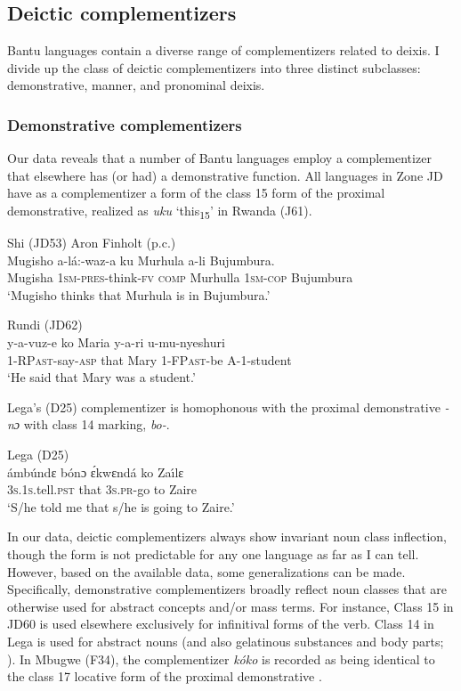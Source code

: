 \documentclass[output=paper,colorlinks,citecolor=brown,
]{langscibook}
\begin{document}
\subsection{Deictic complementizers}\label{sec:gluckman:deicticcompsection}
Bantu languages contain a diverse range of complementizers related to deixis. I divide up the class  of deictic complementizers into three distinct subclasses: demonstrative, manner, and pronominal deixis.

\subsubsection{Demonstrative complementizers}\label{sec:gluckman:demcompsection}

Our data reveals that a number of Bantu languages employ a complementizer that elsewhere has (or had) a demonstrative function. All languages in Zone JD have as a complementizer a form of the class 15 form of the proximal demonstrative, realized as \textit{uku} `this\textsubscript{15}' in Rwanda (J61).

\newpage
\ea
	\begin{xlist}
	\ex Shi (JD53) Aron Finholt (p.c.) \\
	\gll Mugisho a-lá:-waz-a ku Murhula a-li Bujumbura.\\
	Mugisha 1\textsc{sm}-\textsc{pres}-think-\textsc{fv} \textsc{comp} Murhulla 1\textsc{sm}-\textsc{cop} Bujumbura\\
	\glt `Mugisho thinks that Murhula is in Bujumbura.' 
	
	\ex Rundi (JD62) \citep[200]{Sabimana:1986} \\
	\gll y-a-vuz-e ko Maria y-a-ri u-mu-nyeshuri\\
	1-\textsc{RPast}-say-\textsc{asp} that Mary 1-\textsc{FPast}-be \textsc{A}-1-student\\
	\glt `He said that Mary was a student.' 
	\end{xlist}
\z


\noindent Lega's (D25) complementizer is homophonous with the proximal demonstrative \textit{-nɔ} with class 14 marking, \textit{bo-}.

\ea Lega (D25) \citep[214]{Botne:1995} \\
	\gll ámb\'undɛ b\'onɔ \'ɛkwɛndá ko Za{\'\i}lɛ\\
	3\textsc{s.1s.}tell.\textsc{pst} that \textsc{3s.pr}-go to Zaire\\
	\glt `S/he told me that s/he is going to Zaire.' 
\z

In our data, deictic complementizers always show invariant noun class inflection, though the form is not predictable for any one language as far as I can tell.  However, based on the available data, some generalizations can be made. Specifically, demonstrative complementizers broadly reflect noun classes that are otherwise used for abstract concepts and/or mass terms. For instance, Class 15 in JD60 is used elsewhere exclusively for infinitival forms of the verb. Class 14 in Lega is used for abstract nouns (and also gelatinous substances and body parts; \citealt{Botne:2003}). In Mbugwe (F34), the complementizer \textit{k\'oko} is recorded as being identical to the class 17 locative form of the proximal demonstrative \citep{Mous:2004}.
\end{document}
